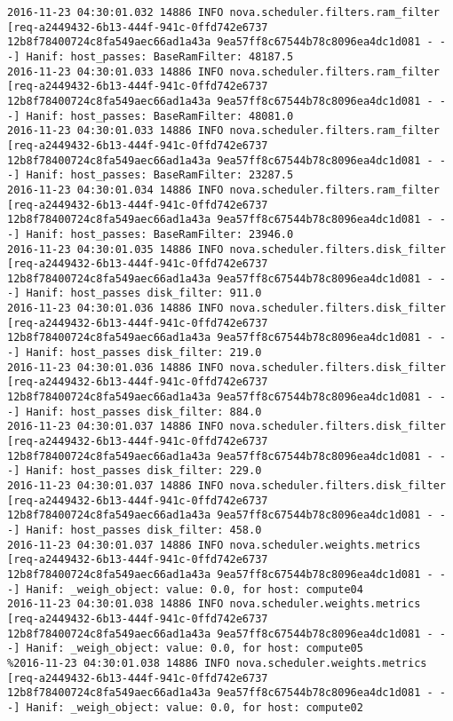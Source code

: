 \begin{lstlisting}[frame=single, caption={The filter scheduler log trace for 10 virtual instances}, label={lst:filterschedulercodetracelog10vi}, escapechar=|]
2016-11-23 04:30:01.032 14886 INFO nova.scheduler.filters.ram_filter [req-a2449432-6b13-444f-941c-0ffd742e6737 12b8f78400724c8fa549aec66ad1a43a 9ea57ff8c67544b78c8096ea4dc1d081 - - -] Hanif: host_passes: BaseRamFilter: 48187.5
2016-11-23 04:30:01.033 14886 INFO nova.scheduler.filters.ram_filter [req-a2449432-6b13-444f-941c-0ffd742e6737 12b8f78400724c8fa549aec66ad1a43a 9ea57ff8c67544b78c8096ea4dc1d081 - - -] Hanif: host_passes: BaseRamFilter: 48081.0
2016-11-23 04:30:01.033 14886 INFO nova.scheduler.filters.ram_filter [req-a2449432-6b13-444f-941c-0ffd742e6737 12b8f78400724c8fa549aec66ad1a43a 9ea57ff8c67544b78c8096ea4dc1d081 - - -] Hanif: host_passes: BaseRamFilter: 23287.5
2016-11-23 04:30:01.034 14886 INFO nova.scheduler.filters.ram_filter [req-a2449432-6b13-444f-941c-0ffd742e6737 12b8f78400724c8fa549aec66ad1a43a 9ea57ff8c67544b78c8096ea4dc1d081 - - -] Hanif: host_passes: BaseRamFilter: 23946.0
2016-11-23 04:30:01.035 14886 INFO nova.scheduler.filters.disk_filter [req-a2449432-6b13-444f-941c-0ffd742e6737 12b8f78400724c8fa549aec66ad1a43a 9ea57ff8c67544b78c8096ea4dc1d081 - - -] Hanif: host_passes disk_filter: 911.0
2016-11-23 04:30:01.036 14886 INFO nova.scheduler.filters.disk_filter [req-a2449432-6b13-444f-941c-0ffd742e6737 12b8f78400724c8fa549aec66ad1a43a 9ea57ff8c67544b78c8096ea4dc1d081 - - -] Hanif: host_passes disk_filter: 219.0
2016-11-23 04:30:01.036 14886 INFO nova.scheduler.filters.disk_filter [req-a2449432-6b13-444f-941c-0ffd742e6737 12b8f78400724c8fa549aec66ad1a43a 9ea57ff8c67544b78c8096ea4dc1d081 - - -] Hanif: host_passes disk_filter: 884.0
2016-11-23 04:30:01.037 14886 INFO nova.scheduler.filters.disk_filter [req-a2449432-6b13-444f-941c-0ffd742e6737 12b8f78400724c8fa549aec66ad1a43a 9ea57ff8c67544b78c8096ea4dc1d081 - - -] Hanif: host_passes disk_filter: 229.0
2016-11-23 04:30:01.037 14886 INFO nova.scheduler.filters.disk_filter [req-a2449432-6b13-444f-941c-0ffd742e6737 12b8f78400724c8fa549aec66ad1a43a 9ea57ff8c67544b78c8096ea4dc1d081 - - -] Hanif: host_passes disk_filter: 458.0
2016-11-23 04:30:01.037 14886 INFO nova.scheduler.weights.metrics [req-a2449432-6b13-444f-941c-0ffd742e6737 12b8f78400724c8fa549aec66ad1a43a 9ea57ff8c67544b78c8096ea4dc1d081 - - -] Hanif: _weigh_object: value: 0.0, for host: compute04
2016-11-23 04:30:01.038 14886 INFO nova.scheduler.weights.metrics [req-a2449432-6b13-444f-941c-0ffd742e6737 12b8f78400724c8fa549aec66ad1a43a 9ea57ff8c67544b78c8096ea4dc1d081 - - -] Hanif: _weigh_object: value: 0.0, for host: compute05
%2016-11-23 04:30:01.038 14886 INFO nova.scheduler.weights.metrics [req-a2449432-6b13-444f-941c-0ffd742e6737 12b8f78400724c8fa549aec66ad1a43a 9ea57ff8c67544b78c8096ea4dc1d081 - - -] Hanif: _weigh_object: value: 0.0, for host: compute02

\end{lstlisting}

